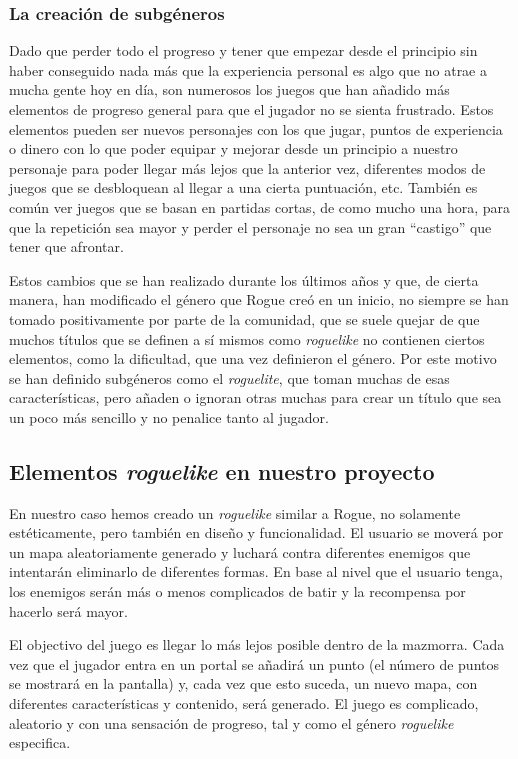\subsubsection{La creación de subgéneros}

Dado que perder todo el progreso y tener que empezar desde el principio sin haber conseguido nada más que la experiencia personal es algo que no atrae a mucha gente hoy en día, son numerosos los juegos que han añadido más elementos de progreso general para que el jugador no se sienta frustrado. Estos elementos pueden ser nuevos personajes con los que jugar, puntos de experiencia o dinero con lo que poder equipar y mejorar desde un principio a nuestro personaje para poder llegar más lejos que la anterior vez, diferentes modos de juegos que se desbloquean al llegar a una cierta puntuación, etc.
También es común ver juegos que se basan en partidas cortas, de como mucho una hora, para que la repetición sea mayor y perder el personaje no sea un gran ``castigo'' que tener que afrontar.

Estos cambios que se han realizado durante los últimos años y que, de cierta manera, han modificado el género que Rogue creó en un inicio, no siempre se han tomado positivamente por parte de la comunidad, que se suele quejar de que muchos títulos que se definen a sí mismos como \textit{roguelike} no contienen ciertos elementos, como la dificultad, que una vez definieron el género. Por este motivo se han definido subgéneros como el \textit{roguelite}, que toman muchas de esas características, pero añaden o ignoran otras muchas para crear un título que sea un poco más sencillo y no penalice tanto al jugador.

\subsection{Elementos \textit{roguelike} en nuestro proyecto}

En nuestro caso hemos creado un \textit{roguelike} similar a Rogue, no solamente estéticamente, pero también en diseño y funcionalidad. El usuario se moverá por un mapa aleatoriamente generado y luchará contra diferentes enemigos que intentarán eliminarlo de diferentes formas. En base al nivel que el usuario tenga, los enemigos serán más o menos complicados de batir y la recompensa por hacerlo será mayor.

El objectivo del juego es llegar lo más lejos posible dentro de la mazmorra. Cada vez que el jugador entra en un portal se añadirá un punto (el número de puntos se mostrará en la pantalla) y, cada vez que esto suceda, un nuevo mapa, con diferentes características y contenido, será generado. El juego es complicado, aleatorio y con una sensación de progreso, tal y como el género \textit{roguelike} especifica.

